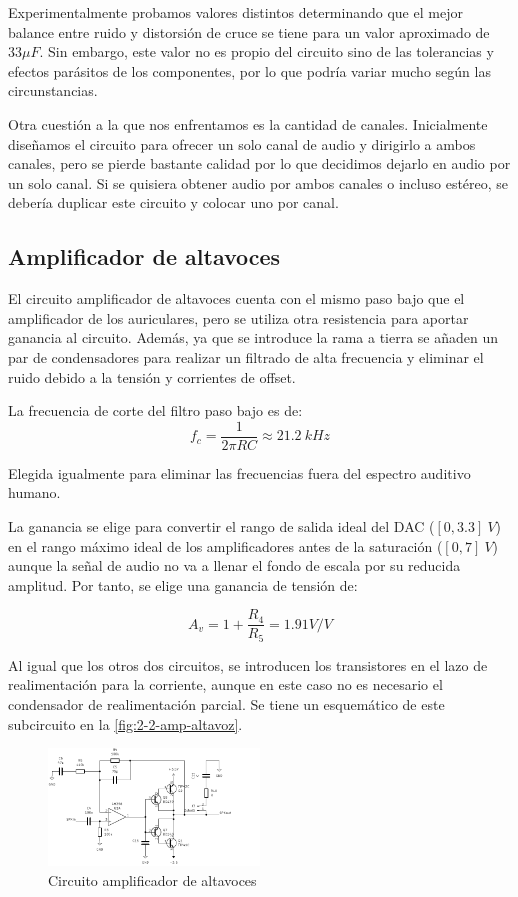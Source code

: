 Experimentalmente probamos valores distintos determinando que el mejor balance entre ruido y distorsión de cruce se tiene para un valor aproximado de $33 \mu F$. Sin embargo, este valor no es propio del circuito sino de las tolerancias y efectos parásitos de los componentes, por lo que podría variar mucho según las circunstancias.

Otra cuestión a la que nos enfrentamos es la cantidad de canales. Inicialmente diseñamos el circuito para ofrecer un solo canal de audio y dirigirlo a ambos canales, pero se pierde bastante calidad por lo que decidimos dejarlo en audio por un solo canal. Si se quisiera obtener audio por ambos canales o incluso estéreo, se debería duplicar este circuito y colocar uno por canal.

\subsection{Amplificador de altavoces}

El circuito amplificador de altavoces cuenta con el mismo paso bajo que el amplificador de los auriculares, pero se utiliza otra resistencia para aportar ganancia al circuito. Además, ya que se introduce la rama a tierra se añaden un par de condensadores para realizar un filtrado de alta frecuencia y eliminar el ruido debido a la tensión y corrientes de offset.

La frecuencia de corte del filtro paso bajo es de:
\[
    f_c = \frac{1}{2\pi RC} \approx 21.2\ kHz
\]

Elegida igualmente para eliminar las frecuencias fuera del espectro auditivo humano.

La ganancia se elige para convertir el rango de salida ideal del DAC ($[0, 3.3]\ V$) en el rango máximo ideal de los amplificadores antes de la saturación ($[0, 7]\ V$) aunque la señal de audio no va a llenar el fondo de escala por su reducida amplitud. Por tanto, se elige una ganancia de tensión de:

\[
    A_v = 1 + \frac{R_4}{R_5} = 1.91 V/V
\]

Al igual que los otros dos circuitos, se introducen los transistores en el lazo de realimentación para la corriente, aunque en este caso no es necesario el condensador de realimentación parcial. Se tiene un esquemático de este subcircuito en la \autoref{fig:2-2-amp-altavoz}.

\begin{figure}[h]
    \centering
    \includegraphics[width=0.5\textwidth]{images/2/2-2/circuitoAmplificadorAltavoces.png}
    \caption{Circuito amplificador de altavoces}
    \label{fig:label}
\end{figure}